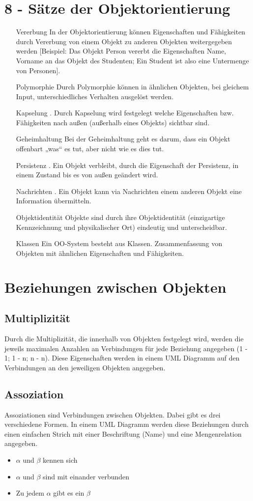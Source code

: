 \section{8 - Sätze der Objektorientierung}
\begin{itemize}
	\item[Vererbung] In der Objektorientierung können Eigenschaften und Fähigkeiten durch Vererbung von einem Objekt zu anderen Objekten weitergegeben werden [Beispiel: Das Objekt Person vererbt die Eigenschaften Name, Vorname an das Objekt des Studenten; Ein Student ist also eine Untermenge von Personen]. 
	\item[Polymorphie] Durch Polymorphie können in ähnlichen Objekten, bei gleichem Input, unterschiedliches Verhalten ausgelöst werden.
	\item[Kapselung] . Durch Kapselung wird festgelegt welche Eigenschaften bzw. Fähigkeiten nach außen (außerhalb eines Objekts) sichtbar sind.
	\item[Geheimhaltung] Bei der Geheimhaltung geht es darum, dass ein Objekt offenbart „was“ es tut, aber nicht wie es dies tut.
	\item[Persistenz] . Ein Objekt verbleibt, durch die Eigenschaft der Persistenz, in einem Zustand bis es von außen geändert wird.
	\item[Nachrichten] . Ein Objekt kann via Nachrichten einem anderen Objekt eine Information übermitteln.
	\item[Objektidentität] Objekte sind durch ihre Objektidentität (einzigartige Kennzeichnung und physikalischer Ort) eindeutig und unterscheidbar.
	\item[Klassen] Ein OO-System besteht aus Klassen. Zusammenfassung von Objekten mit ähnlichen Eigenschaften und Fähigkeiten.
\end{itemize}

\section{Beziehungen zwischen Objekten}
\subsection{Multiplizität}
Durch die Multiplizität, die innerhalb von Objekten festgelegt wird, werden die jeweils maximalen Anzahlen an Verbindungen für jede Beziehung angegeben (1 - 1; 1 - n; n - n). Diese Eigenschaften werden in einem UML Diagramm auf den Verbindungen an den jeweiligen Objekten angegeben.
\subsection{Assoziation}
Assoziationen sind Verbindungen zwischen Objekten. Dabei gibt es drei verschiedene Formen. In einem UML Diagramm werden diese Beziehungen durch einen einfachen Strich mit einer Beschriftung (Name) und eine Mengenrelation angegeben.
\begin{itemize}
	\item $ \alpha $ und $ \beta $ kennen sich
	\item $ \alpha $ und $ \beta $ sind mit einander verbunden
	\item Zu jedem $ \alpha $ gibt es ein $ \beta $
\end{itemize}

